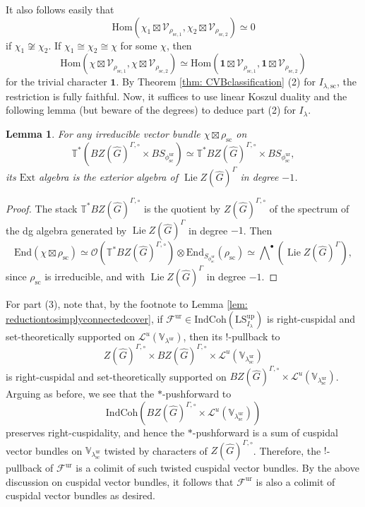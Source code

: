 \documentclass{amsart}
\newtheorem{lemma}[theorem]{Lemma}
\theoremstyle{definition}
\theoremstyle{remark}
\numberwithin{equation}{section}
\DeclareMathOperator{\Lie}{Lie}
\newcommand{\mc}{\mathcal}
\newcommand{\Sc}{\mathrm{sc}}
\newcommand{\Hom}{\mathrm{Hom}}
\newcommand{\wh}{\widehat}
\newcommand{\IndCoh}{\mathrm{IndCoh}}
\newcommand{\ur}{\mathrm{ur}}
\newcommand{\V}{\mathbb{V}}
\newcommand{\T}{\mathbb{T}}
\newcommand{\up}{\mathrm{up}}
\newcommand{\LS}{\mathrm{LS}}
\begin{document}
It also follows easily that
\[
\Hom (\chi_1 \boxtimes \mc V_{\rho_{\Sc,1}}, \chi_2 \boxtimes \mc V_{\rho_{\Sc,2}}) \simeq 0
\]
if $\chi_1 \not\cong \chi_2$. If $\chi_1\cong \chi_2 \cong \chi$ for some $\chi$, then
\[
\Hom (\chi \boxtimes \mc V_{\rho_{\Sc,1}}, \chi \boxtimes \mc V_{\rho_{\Sc,2}}) \simeq
\Hom (\mathbf{1} \boxtimes \mc V_{\rho_{\Sc,1}}, \mathbf{1} \boxtimes \mc V_{\rho_{\Sc,2}})
\]
for the trivial character $\mathbf{1}$. By Theorem \ref{thm: CVBclassification} (2) for $I_{\lambda, \Sc}$, the restriction is fully faithful. Now, it suffices to use linear Koszul duality and the following lemma (but beware of the degrees) to deduce part (2) for $I_\lambda$. 

\begin{lemma}
For any irreducible vector bundle $\chi \boxtimes \rho_{\Sc}$ on 
\[
\T^* (BZ(\wh G)^{\Gamma,\circ}\times BS_{\phi_{\Sc}^\ur})\simeq \T^* BZ(\wh G)^{\Gamma,\circ}\times BS_{\phi_{\Sc}^\ur},
\]
its $\mathrm{Ext}$ algebra is the exterior algebra of $\Lie Z(\wh G)^{\Gamma}$ in degree $-1$. 
\end{lemma}

\begin{proof}
The stack $\T^* BZ(\wh G)^{\Gamma,\circ}$ is the quotient by $Z(\wh G)^{\Gamma,\circ}$ of the spectrum of the dg algebra generated by $\Lie Z(\wh G)^{\Gamma}$ in degree $-1$. Then
\begin{equation*}
    \mathrm{End}(\chi \boxtimes \rho_{\Sc}) \simeq \mc{O}(\T^* BZ(\wh G)^{\Gamma,\circ}) \otimes \mathrm{End}_{S_{{\phi}^{\ur}_{\Sc}}}(\rho_{\Sc}) \simeq \bigwedge\nolimits^{\bullet}(\Lie Z(\wh G)^{\Gamma}), 
\end{equation*}
since $\rho_{\Sc}$ is irreducible, and with $\Lie Z(\wh G)^{\Gamma}$ in degree $-1$.
\end{proof}

For part (3), note that, by the footnote to Lemma \ref{lem: reductiontosimplyconnectedcover}, if $\mc F^\ur\in \IndCoh(\LS^{\up}_{I_{\lambda}})$ is right-cuspidal and set-theoretically supported on $\mc L^u(\V_{\lambda^\ur})$, then its $!$-pullback to 
\[
Z(\wh G)^{\Gamma,\circ} \times B Z(\wh G)^{\Gamma,\circ}\times \mc L^u(\V_{\lambda^\ur_\Sc})
\]
is right-cuspidal and set-theoretically supported on $BZ(\wh G)^{\Gamma,\circ}\times \mc L^u(\V_{\lambda^\ur_\Sc})$. Arguing as before, we see that the $*$-pushforward to 
\[
\IndCoh(BZ(\wh G)^{\Gamma,\circ}\times\mc L^u(\V_{\lambda^\ur_\Sc}))
\]
preserves right-cuspidality, and hence the $*$-pushforward is a sum of cuspidal vector bundles on $\V_{\lambda^\ur_\Sc}$ twisted by characters of $Z(\wh G)^{\Gamma,\circ}$. Therefore, the $!$-pullback of $\mc F^\ur$ is a colimit of such twisted cuspidal vector bundles. By the above discussion on cuspidal vector bundles, it follows that $\mc F^\ur$ is also a colimit of cuspidal vector bundles as desired.  
\end{document}
